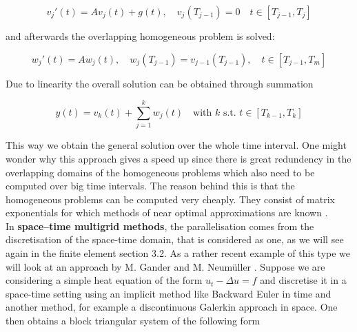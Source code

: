 \documentclass[../draft_1.tex]{subfiles}
\begin{document}
\begin{ceqn}
	\begin{equation}
	v_j'(t) = A v_j(t) + g(t), \quad v_j(T_{j-1}) = 0 \quad t \in [T_{j-1}, T_j]
	\end{equation}
\end{ceqn}
and afterwards the overlapping homogeneous problem is solved:
\begin{ceqn}
	\begin{equation}
	w_j'(t) = A w_j(t), \quad w_j(T_{j-1}) = v_{j-1}(T_{j-1}), \quad t \in [T_{j-1}, T_m]
	\end{equation}
\end{ceqn}
Due to linearity the overall solution can be obtained through summation
\begin{ceqn}
	\begin{equation}
	y(t) = v_k(t) + \sum_{j=1}^{k}w_j(t) \quad \text{with } k \text{ s.t. } t \in [T_{k-1}, T_k]
	\end{equation}
\end{ceqn}
This way we obtain the general solution over the whole time interval. One might wonder why this approach gives a speed up since there is great redundency in the overlapping domains of the homogeneous problems which also need to be computed over big time intervals. The reason behind this is that the homogeneous problems can be computed very cheaply. They consist of matrix exponentials for which methods of near optimal approximations are known \cite{gander2013paraexp}. 
\smallskip
\\
In \textbf{space--time multigrid methods}, the parallelisation comes from the discretisation of the space-time domain, that is considered as one, as we will see again in the finite element section 3.2. As a rather recent example of this type we will look at an approach by M. Gander and M. Neum\"uller \cite{gander2016analysis}. Suppose we are considering a simple heat equation of the form $u_t - \Delta u = f $ and discretise it in a space-time setting using an implicit method like Backward Euler in time and another method, for example a discontinuous Galerkin approach in space. One then obtains a block triangular system of the following form
\end{document}
